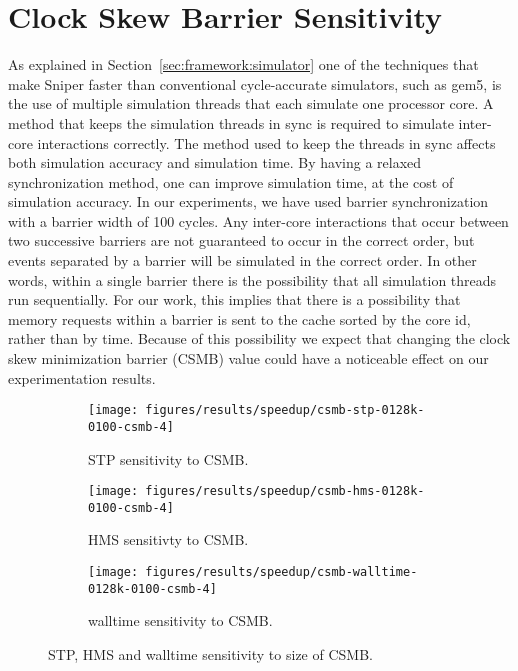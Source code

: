 \section{Clock Skew Barrier Sensitivity}
\label{sec:results:csmb_sensitivity}

As explained in Section~\ref{sec:framework:simulator} one of the techniques that make Sniper faster than conventional cycle-accurate simulators, such as gem5, is the use of multiple simulation threads that each simulate one processor core.
A method that keeps the simulation threads in sync is required to simulate inter-core interactions correctly.
The method used to keep the threads in sync affects both simulation accuracy and simulation time.
By having a relaxed synchronization method, one can improve simulation time, at the cost of simulation accuracy.
In our experiments, we have used barrier synchronization with a barrier width of 100 cycles.
Any inter-core interactions that occur between two successive barriers are not guaranteed to occur in the correct order, but events separated by a barrier will be simulated in the correct order.
In other words, within a single barrier there is the possibility that all simulation threads run sequentially.
For our work, this implies that there is a possibility that memory requests within a barrier is sent to the cache sorted by the core id, rather than by time.
Because of this possibility we expect that changing the clock skew minimization barrier (CSMB) value could have a noticeable effect on our experimentation results.

\begin{figure}[th]
    \centering
    \begin{subfigure}[b]{0.5\textwidth}
        \texttt{[image: figures/results/speedup/csmb-stp-0128k-0100-csmb-4]}
        \caption{STP sensitivity to CSMB.}
        \label{fig:results:csmb:stp}
    \end{subfigure}%
    \begin{subfigure}[b]{0.5\textwidth}
        \texttt{[image: figures/results/speedup/csmb-hms-0128k-0100-csmb-4]}
        \caption{HMS sensitivty to CSMB.}
        \label{fig:results:csmb:hms}
    \end{subfigure}
    \begin{subfigure}[b]{0.6\textwidth}
        \texttt{[image: figures/results/speedup/csmb-walltime-0128k-0100-csmb-4]}
        \caption{walltime sensitivity to CSMB.}
        \label{fig:results:csmb:walltime}
    \end{subfigure}
    \caption{STP, HMS and walltime sensitivity to size of CSMB.}
    \label{fig:results:csmb}
\end{figure}


